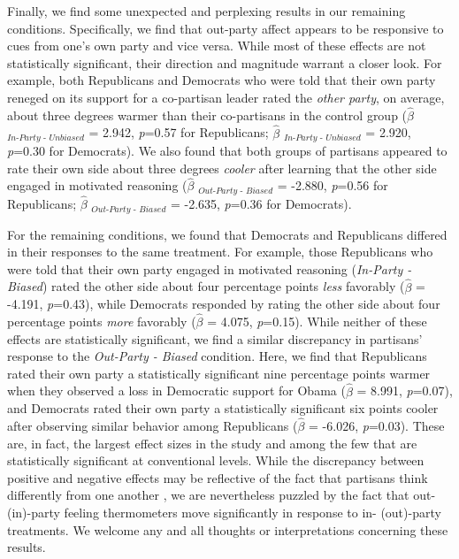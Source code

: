 \documentclass[12pt, letterpaper]{article}
\begin{document}
Finally, we find some unexpected and perplexing results in our remaining conditions. Specifically, we find that out-party affect appears to be responsive to cues from one's own party and vice versa. While most of these effects are not statistically significant, their direction and magnitude warrant a closer look. For example, both Republicans and Democrats who were told that their own party reneged on its support for a co-partisan leader rated the \textit{other party}, on average, about three degrees warmer than their co-partisans in the control group ($\hat{\beta}$ $_{\textit{In-Party - Unbiased}}$ = 2.942, \textit{p}=0.57 for Republicans; $\hat{\beta}$ $_{\textit{In-Party - Unbiased}}$ = 2.920, \textit{p}=0.30 for Democrats). We also found that both groups of partisans appeared to rate their own side about three degrees \textit{cooler} after learning that the other side engaged in motivated reasoning ($\hat{\beta}$ $_{\textit{Out-Party - Biased}}$ = -2.880, \textit{p}=0.56 for Republicans; $\hat{\beta}$ $_{\textit{Out-Party - Biased}}$ = -2.635, \textit{p}=0.36 for Democrats). 

For the remaining conditions, we found that Democrats and Republicans differed in their responses to the same treatment. For example, those Republicans who were told that their own party engaged in motivated reasoning (\textit{In-Party - Biased}) rated the other side about four percentage points \textit{less} favorably ($\hat{\beta}$ = -4.191, \textit{p}=0.43), while Democrats responded by rating the other side about four percentage points \textit{more} favorably ($\hat{\beta}$ = 4.075, \textit{p}=0.15). While neither of these effects are statistically significant, we find a similar discrepancy in partisans' response to the \textit{Out-Party - Biased} condition. Here, we find that Republicans rated their own party a statistically significant nine percentage points warmer when they observed a loss in Democratic support for Obama ($\hat{\beta}$ = 8.991, \textit{p}=0.07), and Democrats rated their own party a statistically significant six points cooler after observing similar behavior among Republicans ($\hat{\beta}$ = -6.026, \textit{p}=0.03). These are, in fact, the largest effect sizes in the study and among the few that are statistically significant at conventional levels. While the discrepancy between positive and negative effects may be reflective of the fact that partisans think differently from one another \citep{grossmanhopkins_2016}, we are nevertheless puzzled by the fact that out- (in)-party feeling thermometers move significantly in response to in- (out)-party treatments. We welcome any and all thoughts or interpretations concerning these results. 
\end{document}

